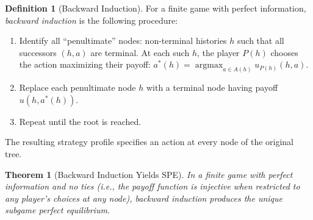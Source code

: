\documentclass[11pt,a4paper]{article}
\theoremstyle{definition}
\newtheorem{definition}{Definition}[section]
\theoremstyle{plain}
\newtheorem{theorem}{Theorem}[section]
\theoremstyle{remark}
\DeclareMathOperator{\argmax}{argmax}
\begin{document}
\begin{definition}[Backward Induction]
\label{def:backward_induction}
For a finite game with perfect information, \emph{backward induction} is the following
procedure:
\begin{enumerate}[nosep]
    \item Identify all ``penultimate'' nodes: non-terminal histories $h$ such that all
    successors $(h, a)$ are terminal. At each such $h$, the player $P(h)$ chooses the
    action maximizing their payoff: $a^*(h) = \argmax_{a \in A(h)} u_{P(h)}(h, a)$.
    \item Replace each penultimate node $h$ with a terminal node having payoff
    $u(h, a^*(h))$.
    \item Repeat until the root is reached.
\end{enumerate}
The resulting strategy profile specifies an action at every node of the original tree.
\end{definition}

\begin{theorem}[Backward Induction Yields SPE]
\label{thm:bi_spe}
In a finite game with perfect information and no ties (i.e., the payoff function is
injective when restricted to any player's choices at any node), backward induction
produces the unique subgame perfect equilibrium.
\end{theorem}
\end{document}
